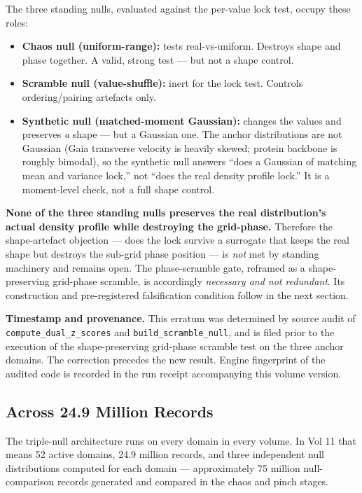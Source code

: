 \documentclass[11pt, letterpaper, openany]{book}
\begin{document}
\begin{theorybox}
The three standing nulls, evaluated against the per-value lock test, occupy these
roles:
\begin{itemize}
\item \textbf{Chaos null (uniform-range):} tests real-vs-uniform. Destroys shape
and phase together. A valid, strong test --- but not a shape control.
\item \textbf{Scramble null (value-shuffle):} inert for the lock test. Controls
ordering/pairing artefacts only.
\item \textbf{Synthetic null (matched-moment Gaussian):} changes the values and
preserves \emph{a} shape --- but a Gaussian one. The anchor distributions are not
Gaussian (Gaia transverse velocity is heavily skewed; protein backbone is roughly
bimodal), so the synthetic null answers ``does a Gaussian of matching mean and
variance lock,'' not ``does the real density profile lock.'' It is a moment-level
check, not a full shape control.
\end{itemize}
\textbf{None of the three standing nulls preserves the real distribution's actual
density profile while destroying the grid-phase.} Therefore the shape-artefact
objection --- does the lock survive a surrogate that keeps the real shape but
destroys the sub-grid phase position --- is \emph{not} met by standing machinery
and remains open. The phase-scramble gate, reframed as a shape-preserving
grid-phase scramble, is accordingly \emph{necessary and not redundant}. Its
construction and pre-registered falsification condition follow in the next section.
\end{theorybox}
 
\begin{empiricalbox}
\textbf{Timestamp and provenance.} This erratum was determined by source audit of
\texttt{compute\_dual\_z\_scores} and \texttt{build\_scramble\_null}, and is filed
prior to the execution of the shape-preserving grid-phase scramble test on the three
anchor domains. The correction precedes the new result. Engine fingerprint of the
audited code is recorded in the run receipt accompanying this volume version.
\end{empiricalbox}

\subsection*{Across 24.9 Million Records}

The triple-null architecture runs on every domain in every volume. In Vol 11
that means 52 active domains, 24.9 million records, and three independent
null distributions computed for each domain --- approximately 75 million
null-comparison records generated and compared in the chaos and pinch stages.
\end{document}
